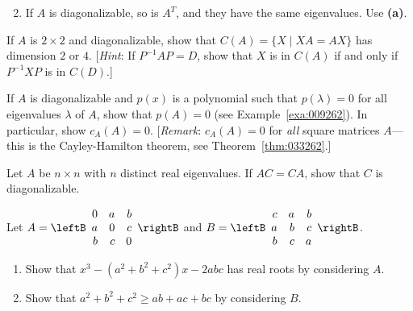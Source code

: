 \begin{multicols}{2}
\begin{ex}
\begin{enumerate}[label={\alph*.}]
\end{enumerate}
\begin{sol}
\begin{enumerate}[label={\alph*.}]
\setcounter{enumi}{1}
\item  If $A$ is diagonalizable, so is $A^{T}$, and they have the same eigenvalues. Use \textbf{(a)}.

\end{enumerate}
\end{sol}
\end{ex}

\begin{ex}
If $A$ is $2 \times 2$ and diagonalizable, show that $C(A) = \{X \mid XA = AX\}$ has dimension $2$ or $4$. [\textit{Hint}: If $P^{-1}AP = D$, show that $X$ is in $C(A)$ if and only if $P^{-1}XP$ is in $C(D)$.]
\end{ex}

\begin{ex}
If $A$ is diagonalizable and $p(x)$ is a polynomial such that $p(\lambda) = 0$ for all eigenvalues $\lambda$ of $A$, show that $p(A) = 0$ (see Example~\ref{exa:009262}). In particular, show $c_{A}(A) = 0$. [\textit{Remark}: $c_{A}(A) = 0$ for \textit{all} square matrices $A$---this is the Cayley-Hamilton theorem, see Theorem~\ref{thm:033262}.]
\end{ex}

\begin{ex}
Let $A$ be $n \times n$ with $n$ distinct real eigenvalues. If $AC = CA$, show that $C$ is diagonalizable.
\end{ex}

\begin{ex}
Let $A = \leftB \begin{array}{rrr}
0 & a & b \\
a & 0 & c \\
b & c & 0	
\end{array} \rightB$ and \newline $B = 
\leftB \begin{array}{rrr}
c & a & b \\
a & b & c \\
b & c & a
\end{array} \rightB$.

\begin{enumerate}[label={\alph*.}]
\item Show that $x^{3} - (a^{2} + b^{2} + c^{2})x - 2abc$ has real roots by considering $A$.

\item Show that $a^{2} + b^{2} + c^{2} \geq ab + ac + bc$ by considering $B$.


\end{enumerate}
\end{ex}
\end{multicols}
